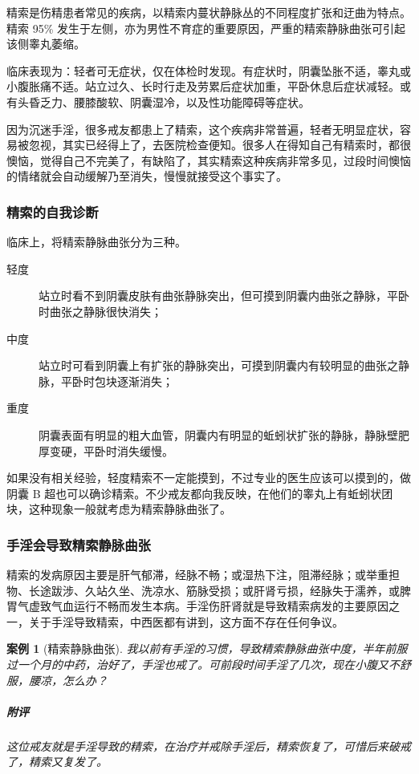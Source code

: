 \documentclass{ctexart}
\newtheorem{case}{案例}
\begin{document}
精索是伤精患者常见的疾病，以精索内蔓状静脉丛的不同程度扩张和迂曲为特点。精索 95\% 发生于左侧，亦为男性不育症的重要原因，严重的精索静脉曲张可引起该侧睾丸萎缩。

临床表现为：轻者可无症状，仅在体检时发现。有症状时，阴囊坠胀不适，睾丸或小腹胀痛不适。站立过久、长时行走及劳累后症状加重，平卧休息后症状减轻。或有头昏乏力、腰膝酸软、阴囊湿冷，以及性功能障碍等症状。

因为沉迷手淫，很多戒友都患上了精索，这个疾病非常普遍，轻者无明显症状，容易被忽视，其实已经得上了，去医院检查便知。很多人在得知自己有精索时，都很懊恼，觉得自己不完美了，有缺陷了，其实精索这种疾病非常多见，过段时间懊恼的情绪就会自动缓解乃至消失，慢慢就接受这个事实了。

\subsubsection{精索的自我诊断}

临床上，将精索静脉曲张分为三种。

\begin{description}
    \item[轻度] 站立时看不到阴囊皮肤有曲张静脉突出，但可摸到阴囊内曲张之静脉，平卧时曲张之静脉很快消失；
    \item[中度] 站立时可看到阴囊上有扩张的静脉突出，可摸到阴囊内有较明显的曲张之静脉，平卧时包块逐渐消失；
    \item[重度] 阴囊表面有明显的粗大血管，阴囊内有明显的蚯蚓状扩张的静脉，静脉壁肥厚变硬，平卧时消失缓慢。
\end{description}

如果没有相关经验，轻度精索不一定能摸到，不过专业的医生应该可以摸到的，做阴囊 B 超也可以确诊精索。不少戒友都向我反映，在他们的睾丸上有蚯蚓状团块，这种现象一般就考虑为精索静脉曲张了。

\subsubsection{手淫会导致精索静脉曲张}

精索的发病原因主要是肝气郁滞，经脉不畅；或湿热下注，阻滞经脉；或举重担物、长途跋涉、久站久坐、洗凉水、筋脉受损；或肝肾亏损，经脉失于濡养，或脾胃气虚致气血运行不畅而发生本病。手淫伤肝肾就是导致精索病发的主要原因之一，关于手淫导致精索，中西医都有讲到，这方面不存在任何争议。

\begin{case}[精索静脉曲张]
    我以前有手淫的习惯，导致精索静脉曲张中度，半年前服过一个月的中药，治好了，手淫也戒了。可前段时间手淫了几次，现在小腹又不舒服，腰凉，怎么办？
    \subparagraph{附评} 这位戒友就是手淫导致的精索，在治疗并戒除手淫后，精索恢复了，可惜后来破戒了，精索又复发了。
\end{case}
\end{document}
